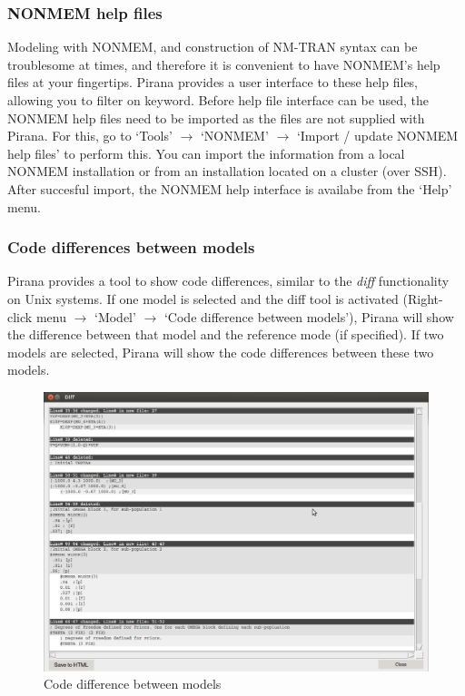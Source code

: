 {{{{\subsubsection*{NONMEM help files}
Modeling with NONMEM, and construction of NM-TRAN syntax can be
troublesome at times, and therefore it is convenient to have NONMEM's
help files at your fingertips. Pirana provides a user interface to
these help files, allowing you to filter on keyword. Before help file
interface can be used, the NONMEM help files need to be imported as
the files are not supplied with Pirana. For this, go to `Tools'
$\rightarrow$ `NONMEM' $\rightarrow$ `Import / update NONMEM help
files' to perform this. You can import the information from a local
NONMEM installation or from an installation located on a cluster (over
SSH). After succesful import, the NONMEM help interface is availabe
from the `Help' menu.

\subsubsection*{Code differences between models}
Pirana provides a tool to show code differences, similar to the
\textit{diff} functionality on Unix systems. If one model is selected
and the diff tool is activated (Right-click menu $\rightarrow$
`Model' $\rightarrow$ `Code difference between models'), Pirana will
show the difference between that model and the reference mode (if
specified). If two models are selected, Pirana will show the code
differences between these two models.

\begin{figure}[H] \centering
    \includegraphics[scale=0.28]{images/diff.png}
    \caption{Code difference between models}
\end{figure}

}}}}
